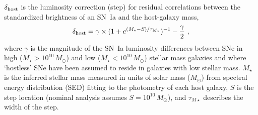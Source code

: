 \documentclass[twocolumn]{aastex63}
\begin{document}
$\delta_{\rm host}$ is the luminosity correction (step) for residual correlations between the standardized brightness of an SN~Ia and the host-galaxy mass,
\begin{equation}
\delta_{\rm host} = \gamma \times (1 + e^{(M_\star - S)/ \tau_{M_\star}})^{-1} - \frac{\gamma}{2}~, \label{eq:BCmu2}
\end{equation}
where $\gamma$ is the magnitude of the SN~Ia luminosity differences between SNe in high ($M_\star>10^{10}\,M_\odot$) and low ($M_\star<10^{10}\,M_\odot$) stellar mass galaxies and where `hostless' SNe have been assumed to reside in galaxies with low stellar mass. $M_\star$ is the inferred stellar mass measured in units of solar mass ($M_\odot$) from spectral energy distribution (SED) fitting to the photometry of each host galaxy, $S$ is the step location (nominal analysis assumes $S=10^{10}\,M_\odot$), and $\tau_{M\star}$ describes the width of the step.
\end{document}
